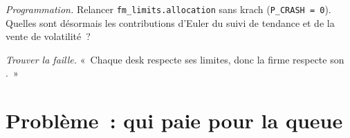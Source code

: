 \begin{exercise}[$\star\star\star$]\label{exo:fm:limits-and-capital-allocation:7}
\emph{Programmation.} Relancer \texttt{fm\_limits.allocation} sans krach (\texttt{P\_CRASH = 0}). Quelles sont désormais les
contributions d'Euler du suivi de tendance et de la vente de volatilité~?
\end{exercise}

\begin{exercise}[$\star\star\star$]\label{exo:fm:limits-and-capital-allocation:8}
\emph{Trouver la faille.} «~Chaque desk respecte ses limites, donc la firme respecte son .~»
\end{exercise}

\section{Problème~: qui paie pour la queue}

